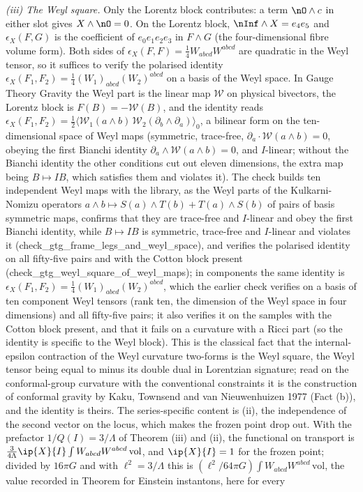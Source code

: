\emph{(iii) The Weyl square.} Only the Lorentz block contributes: a term $\nO \wedge c$ in either slot gives $X \wedge \nO = 0$. On the Lorentz block, $\nInf \wedge X = e_{4}e_{5}$ and $\epsilon_{X}(F, G)$ is the coefficient of $e_{0}e_{1}e_{2}e_{3}$ in $F \wedge G$ (the four-dimensional fibre volume form). Both sides of $\epsilon_{X}(F, F) = \tfrac14 W_{abcd}W^{abcd}$ are quadratic in the Weyl tensor, so it suffices to verify the polarised identity $\epsilon_{X}(F_{1}, F_{2}) = \tfrac14 (W_{1})_{abcd}(W_{2})^{abcd}$ on a basis of the Weyl space. In Gauge Theory Gravity the Weyl part is the linear map $\mathcal{W}$ on physical bivectors, the Lorentz block is $F(B) = -\mathcal{W}(B)$, and the identity reads $\epsilon_{X}(F_{1}, F_{2}) = \tfrac12\langle\mathcal{W}_{1}(a\wedge b)\,\mathcal{W}_{2}(\partial_{b}\wedge\partial_{a})\rangle_{0}$, a bilinear form on the ten-dimensional space of Weyl maps (symmetric, trace-free, $\partial_{a}\cdot\mathcal{W}(a\wedge b) = 0$, obeying the first Bianchi identity $\partial_{a}\wedge\mathcal{W}(a\wedge b) = 0$, and $I$-linear; without the Bianchi identity the other conditions cut out eleven dimensions, the extra map being $B \mapsto IB$, which satisfies them and violates it). The check builds ten independent Weyl maps with the library, as the Weyl parts of the Kulkarni-Nomizu operators $a\wedge b \mapsto S(a)\wedge T(b) + T(a)\wedge S(b)$ of pairs of basis symmetric maps, confirms that they are trace-free and $I$-linear and obey the first Bianchi identity, while $B \mapsto IB$ is symmetric, trace-free and $I$-linear and violates it (check\_gtg\_frame\_legs\_and\_weyl\_space), and verifies the polarised identity on all fifty-five pairs and with the Cotton block present (check\_gtg\_weyl\_square\_of\_weyl\_maps); in components the same identity is $\epsilon_{X}(F_{1}, F_{2}) = \tfrac14(W_{1})_{abcd}(W_{2})^{abcd}$, which the earlier check verifies on a basis of ten component Weyl tensors (rank ten, the dimension of the Weyl space in four dimensions) and all fifty-five pairs; it also verifies it on the samples with the Cotton block present, and that it fails on a curvature with a Ricci part (so the identity is specific to the Weyl block). This is the classical fact that the internal-epsilon contraction of the Weyl curvature two-forms is the Weyl square, the Weyl tensor being equal to minus its double dual in Lorentzian signature; read on the conformal-group curvature with the conventional constraints it is the construction of conformal gravity by Kaku, Townsend and van Nieuwenhuizen 1977 (Fact (b)), and the identity is theirs. The series-specific content is (ii), the independence of the second vector on the locus, which makes the frozen point drop out. With the prefactor $1/Q(I) = 3/\Lambda$ of Theorem (iii) and (ii), the functional on transport is $\tfrac{3}{4\Lambda}\ip{X}{I}\int W_{abcd}W^{abcd}\,\mathrm{vol}$, and $\ip{X}{I} = 1$ for the frozen point; divided by $16\pi G$ and with $\ell^{2} = 3/\Lambda$ this is $(\ell^{2}/64\pi G)\int W_{abcd}W^{abcd}\,\mathrm{vol}$, the value recorded in Theorem  for Einstein instantons, here for every 